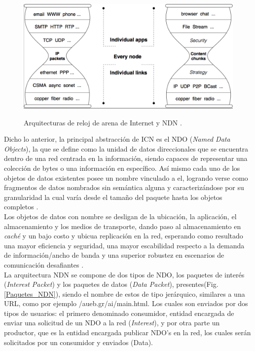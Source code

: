 \documentclass[12pt]{ociamthesis}  %
\begin{document}
	\begin{figure}[!htb]
		\centering
		\includegraphics[width=12cm]{Imagenes/Protocolo_IP_vs_NDN.png}\\
		\caption{Arquitecturas de reloj de arena de Internet y NDN \cite{named_data_networking}.}
		\label{Arq_reloj_arena}
	\end{figure}

Dicho lo anterior, la principal abstracción de ICN es el NDO (\textit{Named Data Objects}), la que se define como la unidad de datos direccionales que se encuentra dentro de una red centrada en la información, siendo capaces de representar una colección de bytes o una información en específico. Así mismo cada uno de los objetos de datos existentes posee un nombre vinculado a el, logrando verse como fragmentos de datos nombrados sin semántica alguna y caracterizándose por su granularidad la cual varía desde el tamaño del paquete hasta los objetos completos \cite{kutscher2016information}\cite{ahlgren2012survey}.\\

Los objetos de datos con nombre se desligan de la ubicación, la aplicación, el almacenamiento y los medios de transporte, dando paso al almacenamiento en \textit{caché} y un bajo costo y ubicua replicación en la red, esperando como resultado una mayor eficiencia y seguridad, una mayor escabilidad respecto a la demanda de información/ancho de banda y una superior robustez en escenarios de comunicación desafiantes \cite{kutscher2016information}.\\

La arquitectura NDN se compone de dos tipos de NDO, los paquetes de interés (\textit{Interest Packet}) y los paquetes de datos (\textit{Data Packet}), presentes(Fig. \ref{Paquetes_NDN}), siendo el nombre de estos de tipo jerárquico, similares a una URL, como por ejemplo /aueb.gr/ai/main.html. Los cuales son enviados por dos tipos de usuarios: el primero denominado consumidor, entidad encargada de enviar una solicitud de un NDO a la red (\textit{Interest}), y por otra parte un productor, que es la entidad encargada publicar NDO's en la red, los cuales serán solicitados por un consumidor y enviados (Data).\\
\end{document}
